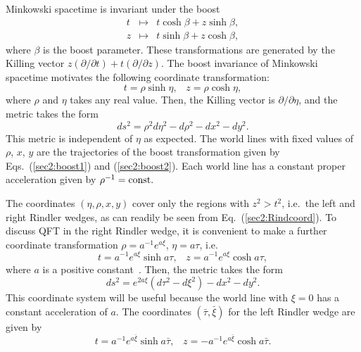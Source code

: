 \documentclass[12pt,nofootinbib,floatfix,aps,prd,showpacs,amsmath,amssymb,eqsecnum]{revtex4-2}
\begin{document}
Minkowski spacetime is invariant under the boost
\begin{eqnarray}
t & \mapsto & t\cosh \beta + z\sinh\beta, \label{sec2:boost1}\\
z & \mapsto & t\sinh \beta + z \cosh \beta, \label{sec2:boost2}
\end{eqnarray}
where $\beta$ is the boost parameter. 
These transformations are generated by the
Killing vector
$z(\partial/\partial t) + t(\partial/\partial z)$.
The boost invariance of Minkowski spacetime
motivates the following coordinate transformation:
\begin{equation}
t  =  \rho\sinh\eta, \;\;\;
z  =  \rho\cosh\eta, 
\label{sec2:Rindcoord}
\end{equation}
where $\rho$ and $\eta$ takes any real value.  Then, the Killing vector
is $\partial/\partial\eta$, and the metric takes
the form
\begin{equation}
ds^2 = \rho^2d\eta^2 - d\rho^2 - dx^2 - dy^2. \label{sec2:RindlerRL}
\end{equation}
This metric is independent of $\eta$ as expected.  The world lines
with fixed values of $\rho$, $x$, $y$ are the trajectories of
the boost transformation given by Eqs.~(\ref{sec2:boost1}) and
(\ref{sec2:boost2}). Each world line has a constant proper
acceleration given by $\rho^{-1} = {\rm const}.$

The coordinates $(\eta,\rho,x,y)$ cover only the regions with $z^2 >
t^2$, i.e.~the left and right Rindler wedges,
as can readily be seen from Eq.~(\ref{sec2:Rindcoord}).  
To discuss QFT in the right
Rindler wedge, it is convenient to make a further coordinate
transformation $\rho = a^{-1}e^{a\xi}$, $\eta = a\tau$, i.e.
\begin{equation}
t = a^{-1}e^{a\xi}\sinh a\tau ,\;\;\;
z = a^{-1}e^{a\xi}\cosh a\tau,  
\label{sec2:rightcoords}
\end{equation}
where $a$ is a positive constant~\cite{Rindler66}.
Then, the metric takes the form
\begin{equation}
ds^2 = e^{2a\xi}(d\tau^2 - d\xi^2) - dx^2 - dy^2. 
\label{sec2:rightmetric}
\end{equation}
This coordinate system will be useful because the world line with $\xi=0$
has a constant acceleration of $a$.  
The coordinates $(\bar{\tau},\bar{\xi})$ for the left Rindler wedge
are given by
\begin{equation}
t = a^{-1}e^{a\bar{\xi}}\sinh a\bar{\tau},\;\;\;
z = - a^{-1}e^{a\bar{\xi}}\cosh a\bar{\tau}.
\label{sec2:leftcoords} 
\end{equation}
\end{document}
